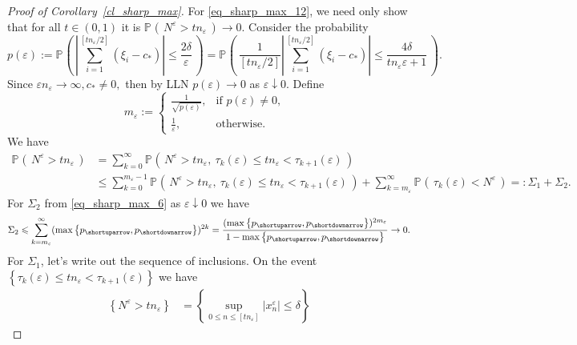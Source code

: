 \documentclass{article}
\theoremstyle{plain}
\theoremstyle{definition}
\theoremstyle{remark}
\newcommand{\p}[2][]{{\mathbb{P}}_{#1} \left( \, #2 \, \right) } %
\newcommand{\ra }{ \rightarrow} %
\newcommand{\skk}[1]{\left\{ #1 \right\}} %
\begin{document}
\begin{proof}[Proof of Corollary~\ref{cl_sharp_max}]
For \eqref{eq_sharp_max_12}, we need only show that for all $t \in (0,1)$ it is $\p{N^{\varepsilon} > t n_{\varepsilon}} \ra 0.$
Consider the probability 
\begin{equation*}
    p(\varepsilon):= \p{ \left| \sum\limits_{i = 1}^{\left[t n_{\varepsilon}/2\right]} \left( \xi_i - c_* \right) \right| \leqslant \frac{2\delta}{\varepsilon} } = \p{ \frac{1}{\left[t n_{\varepsilon}/2\right]}\left| \sum\limits_{i = 1}^{\left[t n_{\varepsilon}/2\right]} \left( \xi_i - c_* \right) \right| \leqslant \frac{4\delta}{t n_{\varepsilon}\varepsilon+1} }. 
\end{equation*}
Since $\varepsilon n_{\varepsilon} \ra \infty, c_* \neq 0,$ then by LLN $p(\varepsilon) \ra 0$ as $\varepsilon \downarrow 0.$
Define 
$$
m_{\varepsilon}:=\begin{cases}
			\frac{1}{\sqrt{p(\varepsilon)}}, & \text{if $p(\varepsilon) \neq 0,$ }\\
            \frac{1}{\varepsilon}, & \text{otherwise.}
		 \end{cases}
$$
We have 
\begin{equation*}
\begin{split}
     \p{N^\varepsilon > t n_\varepsilon} & = \sum_{k=0}^{\infty} \p{N^\varepsilon > t n_\varepsilon, \ \tau_{k}(\varepsilon) \leqslant t n_{\varepsilon} <  \tau_{k+1}(\varepsilon) } \\ 
& \leqslant \sum_{k=0}^{m_{\varepsilon}-1} \p{N^\varepsilon > t n_\varepsilon, \ \tau_{k}(\varepsilon) \leqslant t n_{\varepsilon} <  \tau_{k+1}(\varepsilon) }  + \sum_{k=m_{\varepsilon}}^{\infty} \p{\tau_{k}(\varepsilon)  < N^{\varepsilon}}  =: \Sigma_1 + \Sigma_2. 
\end{split}
\end{equation*}
For $\Sigma_2$ from  \eqref{eq_sharp_max_6} as $\varepsilon \downarrow 0$ we have
\begin{equation*}
    \Sigma_2 \leqslant \sum_{k=m_{\varepsilon}}^{\infty}  (\max\skk{p_{\shortuparrow}, p_{\shortdownarrow}})^{2k} = \frac{(\max\skk{p_{\shortuparrow}, p_{\shortdownarrow}})^{2m_{\varepsilon}}}{1 - \max\skk{p_{\shortuparrow}, p_{\shortdownarrow}}} \ra 0.
\end{equation*}
For $\Sigma_1$, let's write out the sequence of inclusions. On the event $\skk{\tau_{k}(\varepsilon) \leqslant t n_{\varepsilon} <  \tau_{k+1}(\varepsilon)}$ we have 
\begin{equation*}
\begin{split}
     \skk{N^\varepsilon > t n_\varepsilon }  & = \skk{ \sup\limits_{0 \leqslant n \leqslant [t n_{\varepsilon}]} \left|x_n^{\varepsilon}\right| \leqslant \delta} 

\end{split}
\end{equation*}
\end{proof}
\end{document}
